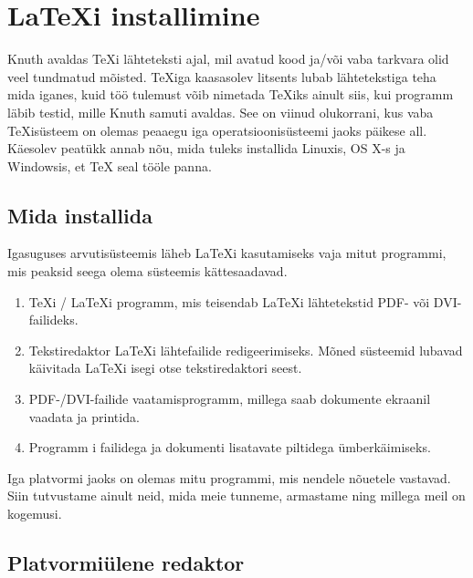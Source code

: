 \appendix
\chapter{\LaTeX i installimine}
\begin{intro}
Knuth avaldas \TeX i lähteteksti ajal, mil
avatud kood ja/või vaba tarkvara olid veel tundmatud mõisted. \TeX iga
kaasasolev litsents lubab lähtetekstiga teha mida iganes, kuid töö
tulemust võib nimetada \TeX iks ainult siis, kui programm läbib testid,
mille Knuth samuti avaldas. See on viinud
olukorrani, kus vaba \TeX isüsteem on olemas peaaegu iga
operatsioonisüsteemi jaoks päikese all. Käesolev peatükk annab nõu, mida
tuleks installida Linuxis, OS X-s ja Windowsis, et \TeX{} seal tööle
panna.
\end{intro}

\section{Mida installida}

Igasuguses arvutisüsteemis läheb \LaTeX i kasutamiseks vaja mitut
programmi, mis peaksid seega olema süsteemis kättesaadavad.

\begin{enumerate}

\item \TeX i / \LaTeX i programm, mis teisendab \LaTeX i lähtetekstid
PDF- või DVI-failideks.

\item Tekstiredaktor \LaTeX i lähtefailide redigeerimiseks. Mõned
süsteemid lubavad käivitada \LaTeX i isegi otse tekstiredaktori seest.

\item PDF-/DVI-failide vaatamisprogramm, millega saab dokumente
ekraanil vaadata ja printida.

\item Programm \PSi i failidega ja dokumenti lisatavate piltidega
ümberkäimiseks.

\end{enumerate}

Iga platvormi jaoks on olemas mitu programmi, mis nendele nõuetele
vastavad. Siin tutvustame ainult neid, mida meie tunneme, armastame ning
millega meil on kogemusi.

\section{Platvormiülene redaktor}
\label{sec:texmaker}

